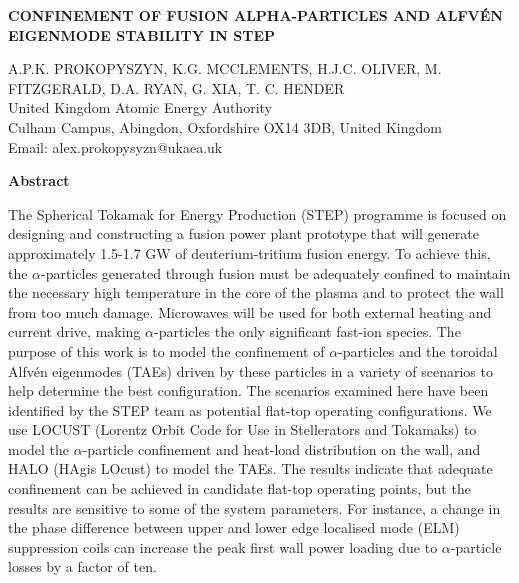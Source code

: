 \documentclass[10pt, a4paper, twoside]{article}
\begin{document}
\begin{flushleft}
\fontsize{12}{14}\selectfont \textbf{CONFINEMENT OF FUSION ALPHA-PARTICLES AND ALFV\'EN EIGENMODE STABILITY IN STEP}

\fontsize{10}{13}\selectfont
A.P.K. PROKOPYSZYN, K.G. MCCLEMENTS, H.J.C. OLIVER, M. FITZGERALD, D.A. RYAN, G. XIA, T. C. HENDER \\
United Kingdom Atomic Energy Authority \\
Culham Campus, Abingdon, Oxfordshire OX14 3DB, United Kingdom \\
Email: alex.prokopysyzn@ukaea.uk

\end{flushleft}

\begin{flushleft}
\textbf{Abstract}
\end{flushleft}

\setlength{\parindent}{1cm}
\fontsize{9}{12pt}\selectfont

The Spherical Tokamak for Energy Production (STEP) programme is focused on designing and constructing a fusion power plant prototype that will generate approximately 1.5-1.7 GW of deuterium-tritium fusion energy. To achieve this, the $\alpha$-particles generated through fusion must be adequately confined to maintain the necessary high temperature in the core of the plasma and to protect the wall from too much damage. Microwaves will be used for both external heating and current drive, making $\alpha$-particles the only significant fast-ion species. The purpose of this work is to model the confinement of $\alpha$-particles and the toroidal Alfvén eigenmodes (TAEs) driven by these particles in a variety of scenarios to help determine the best configuration. The scenarios examined here have been identified by the STEP team as potential flat-top operating configurations. We use LOCUST (Lorentz Orbit Code for Use in Stellerators and Tokamaks) to model the $\alpha$-particle confinement and heat-load distribution on the wall, and HALO (HAgis LOcust) to model the TAEs. The results indicate that adequate confinement can be achieved in candidate flat-top operating points, but the results are sensitive to some of the system parameters. For instance, a change in the phase difference between upper and lower edge localised mode (ELM) suppression coils can increase the peak first wall power loading due to $\alpha$-particle losses by a factor of ten.
\end{document}
